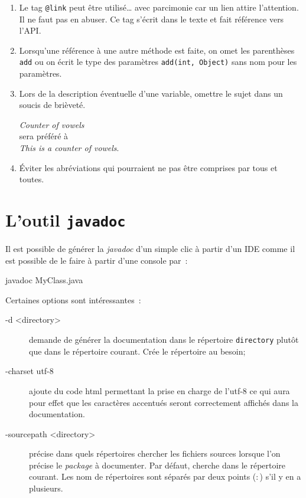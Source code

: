 \begin{enumerate}
	\item Le tag \texttt{@link} peut être utilisé… avec parcimonie car un lien
		attire l'attention. Il ne faut pas en abuser. Ce tag s'écrit dans le
		texte et fait référence vers l'API.

	\item Lorsqu'une référence à une autre méthode est faite, on omet les
		parenthèses \texttt{add} ou on écrit le type des paramètres
		\texttt{add(int, Object)} sans nom pour les paramètres. 

	\item Lors de la description éventuelle d'une variable, omettre le sujet
		dans un soucis de brièveté. 

		\medskip
		\textit{Counter of vowels}\\
		sera préféré à\\
		\textit{This is a counter of vowels}.

	\item Éviter les abréviations qui pourraient ne pas être comprises par tous
		et toutes. 

\end{enumerate}







\section{L'outil \texttt{javadoc}}

Il est possible de générer la \textit{javadoc} d'un simple clic à partir d'un IDE comme il est possible de le faire à partir d'une console par~:

\begin{term}
	javadoc MyClass.java
\end{term}

Certaines options sont intéressantes~:

\begin{description}

	\item[-d <directory>] demande de générer la documentation dans le
		répertoire \texttt{directory} plutôt que dans le répertoire courant.
		Crée le répertoire au besoin;

	\item[-charset utf-8] ajoute du code html permettant la prise en charge de
		l'utf-8 ce qui aura pour effet que les caractères accentués seront
		correctement affichés dans la documentation. 

	\item[-sourcepath <directory>] précise dans quels répertoires chercher les
		fichiers sources lorsque l'on précise le \textit{package} à documenter.
		Par défaut, cherche dans le répertoire courant. Les nom de répertoires
		sont séparés par deux points ($:$) s'il y en a plusieurs.

\end{description}

